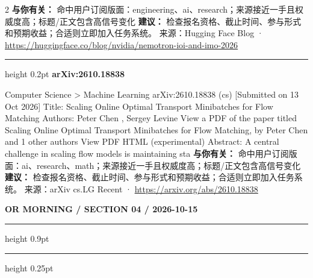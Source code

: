 \documentclass[10.5pt]{ctexart}
\begin{document}
\begin{multicols}{2}
\textbf{与你有关：} 命中用户订阅版面：engineering、ai、research；来源接近一手且权威度高；标题/正文包含高信号变化
\textbf{建议：} 检查报名资格、截止时间、参与形式和预期收益；合适则立即加入任务系统。
{\footnotesize\color{ormuted} 来源：Hugging Face Blog · \url{https://huggingface.co/blog/nvidia/nemotron-ioi-and-imo-2026}}
\vspace{2mm}
\hrule height 0.2pt
\vspace{2mm}
{\large\bfseries arXiv:2610.18838}\par
Computer Science > Machine Learning arXiv:2610.18838 (cs) [Submitted on 13 Oct 2026] Title: Scaling Online Optimal Transport Minibatches for Flow Matching Authors: Peter Chen , Sergey Levine View a PDF of the paper titled Scaling Online Optimal Transport Minibatches for Flow Matching, by Peter Chen and 1 other authors View PDF HTML (experimental) Abstract: A central challenge in scaling flow models is maintaining sta
\textbf{与你有关：} 命中用户订阅版面：ai、research、math；来源接近一手且权威度高；标题/正文包含高信号变化
\textbf{建议：} 检查报名资格、截止时间、参与形式和预期收益；合适则立即加入任务系统。
{\footnotesize\color{ormuted} 来源：arXiv cs.LG Recent · \url{https://arxiv.org/abs/2610.18838}}
\end{multicols}
\newpage
{\small\bfseries OR MORNING / SECTION 04 / 2026-10-15}
\vspace{2mm}
\hrule height 0.9pt
\vspace{1.5mm}
\hrule height 0.25pt
\vspace{4mm}
\end{document}
